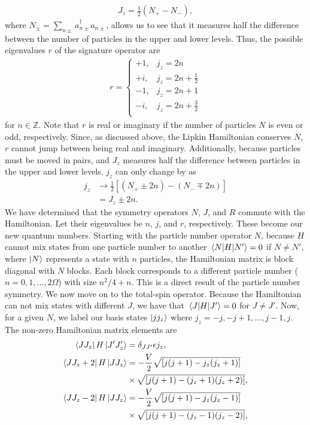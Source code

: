 \documentclass[10pt]{article}
\begin{document}
\begin{align}
J_z=\frac{1}{2}(N_+-N_-),
\end{align}
where $N_\pm=\sum_{n\pm}a^\dagger_{n\pm}a_{n\pm}$, allows us to see that it measures half the difference between the number of particles in the upper and lower levels. Thus, the possible eigenvalues $r$ of the signature operator are
\begin{align}
r
=
\begin{cases}
+1, & j_z=2n \\
+i, & j_z=2n+\frac{1}{2} \\
-1, & j_z=2n+1 \\
-i, & j_z=2n+\frac{3}{2} \\
\end{cases}
\end{align}
for $n\in\mathbb{Z}$. Note that $r$ is real or imaginary if the number of particles $N$ is even or odd, respectively. Since, as discussed above, the Lipkin Hamiltonian conserves $N$, $r$ cannot jump between being real and imaginary. Additionally, because particles must be moved in pairs, and $J_z$ measures half the difference between particles in the upper and lower levels, $j_z$ can only change by as
\begin{align}
j_z
&\to
\frac{1}{2}[(N_+\pm 2n)-(N_-\mp 2n)]
\nonumber
\\
&=
J_z\pm2n.
\end{align}
We have determined that the symmetry operators $N$, $J$, and $R$ commute with the Hamiltonian. Let their eigenvalues be $n$, $j$, and $r$, respectively. These become our new quantum numbers. Starting with the particle number operator $N$, because $H$ cannot mix states from one particle number to another $\mel{N}{H}{N'}=0$ if $N\neq N'$, where $\ket{N}$ represents a state with $n$ particles,
the Hamiltonian matrix is block diagonal with $N$ blocks. Each block corresponds to a different particle number ($n=0,1,...,2\Omega$) with size $n^2/4+n$. This is a direct result of the particle number symmetry. We now move on to the total-spin operator. Because the Hamiltonian can not mix states with different $J$, we have that $\mel{J}{H}{J'}=0$ for $J\neq J'$. Now, for a given $N$, we label our basis states $\ket{jj_z}$ where $j_z=-j,-j+1,...,j-1,j$.
The non-zero Hamiltonian matrix elements are
\begin{align}
\bra{JJ_z}H\ket{J'J'_z} 
&=
\delta_{JJ'}\epsilon j_z,
\\
\bra{JJ_z+2}H\ket{JJ_z} &= 
-\frac{V}{2}\sqrt{[j(j+1)-j_z(j_z+1)]}
\nonumber
\\
&\times
\sqrt{[j(j+1)-(j_z+1)(j_z+2)]},
\\
\bra{JJ_z-2}H\ket{JJ_z} &= 
-\frac{V}{2}\sqrt{[j(j+1)-j_z(j_z-1)]}
\nonumber
\\
&\times
\sqrt{[j(j+1)-(j_z-1)(j_z-2)]},
\end{align}
\end{document}
